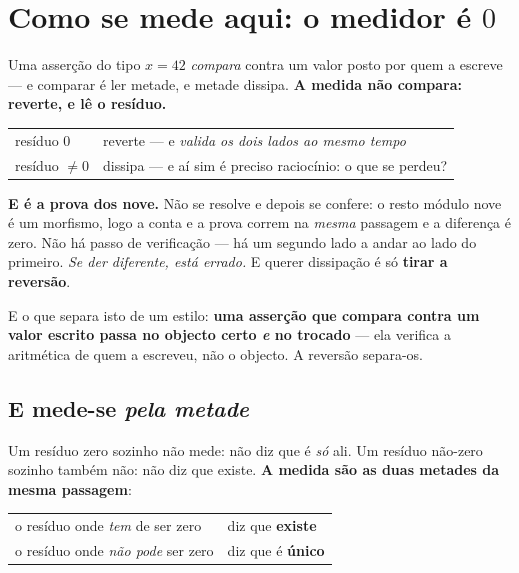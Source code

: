 \documentclass[11pt,a4paper]{article}
\begin{document}
\section{Como se mede aqui: o medidor é $0$}\label{sec:medir}

Uma asserção do tipo $x=42$ \emph{compara} contra um valor posto por quem a escreve --- e comparar é
ler metade, e metade dissipa. \textbf{A medida não compara: reverte, e lê o resíduo.}

\begin{center}\small
\begin{tabular}{@{}ll@{}}
\toprule
resíduo $0$ & reverte --- e \emph{valida os dois lados ao mesmo tempo} \\
resíduo $\neq0$ & dissipa --- e aí sim é preciso raciocínio: o que se perdeu? \\
\bottomrule
\end{tabular}
\end{center}

\noindent \textbf{E é a prova dos nove.} Não se resolve e depois se confere: o resto módulo nove é um
morfismo, logo a conta e a prova correm na \emph{mesma} passagem e a diferença é zero. Não há passo
de verificação --- há um segundo lado a andar ao lado do primeiro. \emph{Se der diferente, está
errado.} E querer dissipação é só \textbf{tirar a reversão}.

\smallskip
\noindent E o que separa isto de um estilo: \textbf{uma asserção que compara contra um valor escrito
passa no objecto certo \emph{e} no trocado} --- ela verifica a aritmética de quem a escreveu, não o
objecto. A reversão separa-os.

\subsection*{E mede-se \emph{pela metade}}

Um resíduo zero sozinho não mede: não diz que é \emph{só} ali. Um resíduo não-zero sozinho também
não: não diz que existe. \textbf{A medida são as duas metades da mesma passagem}:

\begin{center}\small
\begin{tabular}{@{}ll@{}}
\toprule
o resíduo onde \emph{tem} de ser zero & diz que \textbf{existe} \\
o resíduo onde \emph{não pode} ser zero & diz que é \textbf{único} \\
\bottomrule
\end{tabular}
\end{center}
\end{document}
